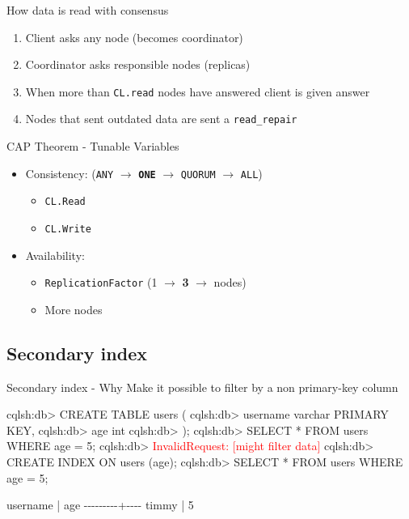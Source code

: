 \documentclass[
  10pt
]{beamer}
\begin{document}
\begin{frame}{How data is read with consensus \cite{ReadConsensus}}
  \begin{enumerate}
    \item<1-> Client asks any node (becomes coordinator)
    \item<2-> Coordinator asks responsible nodes (replicas)
    \item<3-> When more than \lstinline{CL.read} nodes have answered client is given answer
    \item<4-> Nodes that sent outdated data are sent a \lstinline{read_repair}
  \end{enumerate}
\end{frame}

\begin{frame}{CAP Theorem - Tunable Variables \cite{CAPtheoremVariables}}
  \begin{itemize}
    \item<+-> Consistency: (\lstinline{ANY} $\rightarrow$ \textbf{\lstinline{ONE}} $\rightarrow$ \lstinline{QUORUM} $\rightarrow$ \lstinline{ALL})
      \begin{itemize}
        \item \lstinline{CL.Read}
        \item \lstinline{CL.Write}
      \end{itemize}
    \item<+-> Availability:
      \begin{itemize}
        \item \lstinline{ReplicationFactor} (1 $\rightarrow$ \textbf{3} $\rightarrow$ nodes)
        \item More nodes
      \end{itemize}
  \end{itemize}
\end{frame}

\subsection{Secondary index}  %

\begin{frame}[fragile]{Secondary index - Why}
  Make it possible to filter by a non primary-key column
  \begin{semiverbatim}
  cqlsh:db> CREATE TABLE users (
  cqlsh:db>  username varchar PRIMARY KEY,
  cqlsh:db>  age int
  cqlsh:db> );
  cqlsh:db> SELECT * FROM users WHERE age = 5;
  cqlsh:db> \textcolor{red}{InvalidRequest: [might filter data]}
  cqlsh:db> CREATE INDEX ON users (age);
  cqlsh:db> SELECT * FROM users WHERE age = 5;

   username | age
   \--\--\--\--\--\--\--\--\--+\--\--\--\--
      timmy |   5
  \end{semiverbatim}
\end{frame}
\end{document}
